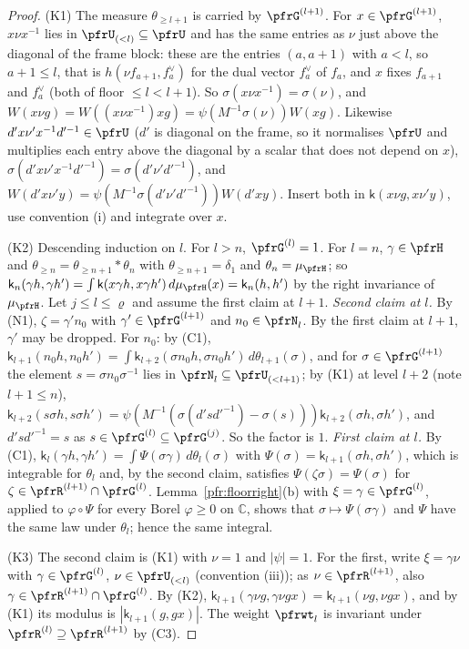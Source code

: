 \documentclass[10pt]{amsart}
\theoremstyle{definition}
\theoremstyle{remark}
\newcommand{\C}{\mathbb C}
\begin{document}
\begin{proof}
(K1) The measure $\theta_{\ge l+1}$ is carried by $\pfrG^{(l+1)}$. For $x\in\pfrG^{(l+1)}$, $x\nu x^{-1}$ lies in
$\pfrU_{(<l)}\subseteq\pfrU$ and has the same entries as $\nu$ just above the diagonal of the frame block: these are
the entries $(a,a+1)$ with $a<l$, so $a+1\le l$, that is $h(\nu f_{a+1},f^\vee_a)$ for the dual
vector $f_a^\vee$ of $f_a$, and $x$ fixes $f_{a+1}$ and $f_a^\vee$ (both of floor $\le l<l+1$). So $\sigma(x\nu x^{-1})=\sigma(\nu)$, and
$W(x\nu g)=W((x\nu x^{-1})xg)=\psi(M^{-1}\sigma(\nu))W(xg)$. Likewise $d'x\nu'x^{-1}d'^{-1}\in\pfrU$ ($d'$ is diagonal
on the frame, so it normalises $\pfrU$ and multiplies each entry above the diagonal by a scalar that does not
depend on $x$), $\sigma(d'x\nu'x^{-1}d'^{-1})=\sigma(d'\nu'd'^{-1})$, and $W(d'x\nu'y)=\psi(M^{-1}\sigma(d'\nu'd'^{-1}))
W(d'xy)$. Insert both in $\mathsf k(x\nu g,x\nu'y)$, use convention (i) and integrate over $x$.

(K2) Descending induction on $l$. For $l>n$, $\pfrG^{(l)}=1$. For $l=n$, $\gamma\in\pfrH$ and
$\theta_{\ge n}=\theta_{\ge n+1}*\theta_n$ with $\theta_{\ge n+1}=\delta_1$ and $\theta_n=\mu_\pfrH$; so
$\mathsf k_n(\gamma h,\gamma h')=\int\mathsf k(x\gamma h,x\gamma h')\,d\mu_\pfrH(x)=\mathsf k_n(h,h')$ by the right
invariance of $\mu_\pfrH$. Let $j\le l\le\varrho$ and assume the first claim at $l+1$. \emph{Second claim at
$l$.} By (N1), $\zeta=\gamma'n_0$ with $\gamma'\in\pfrG^{(l+1)}$ and $n_0\in\pfrN_l$. By the first claim at $l+1$,
$\gamma'$ may be dropped. For $n_0$: by (C1), $\mathsf k_{l+1}(n_0h,n_0h')=\int\mathsf k_{l+2}(\sigma n_0h,\sigma
n_0h')\,d\theta_{l+1}(\sigma)$, and for $\sigma\in\pfrG^{(l+1)}$ the element $s=\sigma n_0\sigma^{-1}$ lies in
$\pfrN_l\subseteq\pfrU_{(<l+1)}$; by (K1) at level $l+2$ (note $l+1\le n$), $\mathsf k_{l+2}(s\sigma h,s\sigma h')=
\psi(M^{-1}(\sigma(d'sd'^{-1})-\sigma(s)))\mathsf k_{l+2}(\sigma h,\sigma h')$, and $d'sd'^{-1}=s$ as $s\in\pfrG^{(l)}
\subseteq\pfrG^{(j)}$. So the factor is $1$. \emph{First claim at $l$.} By (C1), $\mathsf k_l(\gamma h,\gamma h')=
\int\Psi(\sigma\gamma)\,d\theta_l(\sigma)$ with $\Psi(\sigma)=\mathsf k_{l+1}(\sigma h,\sigma h')$, which is integrable
for $\theta_l$ and, by the second claim, satisfies $\Psi(\zeta\sigma)=\Psi(\sigma)$ for $\zeta\in\pfrR^{(l+1)}\cap
\pfrG^{(l)}$. Lemma~\ref{pfr:floorright}(b) with $\xi=\gamma\in\pfrG^{(l)}$, applied to $\varphi\circ\Psi$ for every
Borel $\varphi\ge0$ on $\C$, shows that $\sigma\mapsto\Psi(\sigma\gamma)$ and $\Psi$ have the same law under
$\theta_l$; hence the same integral.

(K3) The second claim is (K1) with $\nu=1$ and $|\psi|=1$. For the first, write $\xi=\gamma\nu$ with
$\gamma\in\pfrG^{(l)}$, $\nu\in\pfrU_{(<l)}$ (convention (iii)); as $\nu\in\pfrR^{(l+1)}$, also $\gamma\in\pfrR^{(l+1)}
\cap\pfrG^{(l)}$. By (K2), $\mathsf k_{l+1}(\gamma\nu g,\gamma\nu gx)=\mathsf k_{l+1}(\nu g,\nu gx)$, and by (K1) its
modulus is $|\mathsf k_{l+1}(g,gx)|$. The weight $\pfrwt_l$ is invariant under $\pfrR^{(l)}\supseteq\pfrR^{(l+1)}$ by
(C3).
\end{proof}
\end{document}
